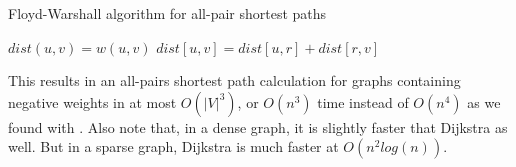 \documentclass[titlepage, 12pt, leqno]{article}
\begin{document}
\pagebreak

\begin{algorithm}
\caption{Floyd-Warshall algorithm for all-pair shortest paths}
\begin{algorithmic}[1]
            \State $dist(u,v) = w(u,v)$
        \EndFor
    \EndFor
                    \State $dist[u,v] = dist[u,r] + dist[r,v]$
                \EndIf
            \EndFor
        \EndFor
    \EndFor
\EndProcedure
\end{algorithmic}
\end{algorithm}

This results in an all-pairs shortest path calculation for graphs containing
negative weights in at most $O(|V|^{3})$, or $O(n^{3})$ time instead of 
$O(n^{4})$ as we found with . Also note that, in a dense
graph, it is slightly faster that Dijkstra as well. But in a sparse graph,
Dijkstra is much faster at $O(n^{2}log(n))$.
\end{document}
